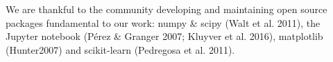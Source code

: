 \documentclass[usenatbib]{mnras}
\begin{document}
We are thankful to the community developing and maintaining open source packages fundamental to our work: numpy
\&  scipy  (Walt  et  al.  2011),  the  Jupyter  notebook  (P\'erez \& Granger 2007; Kluyver et al. 2016), matplotlib (Hunter2007) and  scikit-learn (Pedregosa et al. 2011).






\bsp	%
\label{lastpage}
\end{document}

